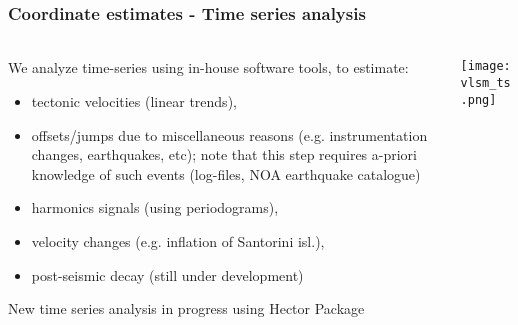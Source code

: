 \begin{frame}
  \frametitle{Coordinate estimates - Time series analysis}
  \framesubtitle{}
  \label{}
  \vskip-1cm
  \begin{columns}[T]
    \begin{column}{.4\textwidth}
      \footnotesize{
      We analyze time-series using in-house software tools, to estimate:
      \begin{itemize}
        \item tectonic velocities (linear trends),
        \item offsets/jumps due to miscellaneous reasons (e.g. instrumentation 
          changes, earthquakes, etc); note that this step requires a-priori 
          knowledge of such events (log-files, NOA earthquake catalogue)
        \item harmonics signals (using periodograms),
        \item velocity changes (e.g. inflation of Santorini isl.),
        \item post-seismic decay (still under development)
      \end{itemize}}
      New time series analysis in progress using Hector Package \citep{Bos2012}
    \end{column}
    \begin{column}{.6\textwidth}
      \begin{center}
        \texttt{[image: vlsm\_ts.png]}
      \end{center}
    \end{column}
  \end{columns}
 
\end{frame}
\note{}

%       
%      


